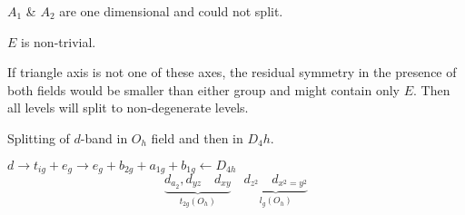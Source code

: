 $A_{1}$ \& $A_{2}$ are one dimensional and could not split.

$E$ is non-trivial.

If triangle axis is not one of these axes, the residual symmetry in the presence of both fields would be smaller than either group and might contain only $E$. Then all levels will split to non-degenerate levels.

Splitting of $d$-band in $O_{h}$ field and then in $D_{4}h$.

$d\to t_{ig}+e_{g}\to e_{g}+b_{2g}+a_{1g}+b_{1g}\leftarrow D_{4h}$
$$
\underbrace{d_{a_{2}},d_{yz}\quad d_{xy}}_{t_{2g}(O_{h})}\quad \underbrace{d_{z^{2}}\quad d_{x^{2}=y^{2}}}_{l_{g}(O_{h})}
$$
